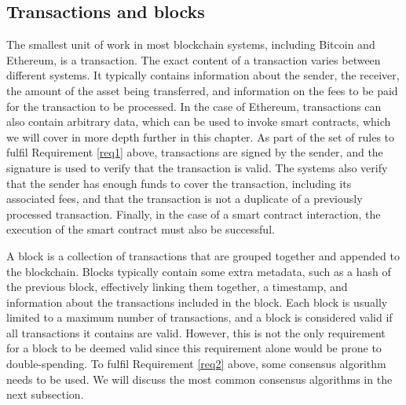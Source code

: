 
\subsection{Transactions and blocks}
 The smallest unit of work in most blockchain systems, including Bitcoin and Ethereum, is a transaction.
The exact content of a transaction varies between different systems. It typically contains information about the sender, the receiver, the amount of the asset being transferred, and information on the fees to be paid for the transaction to be processed.
In the case of Ethereum, transactions can also contain arbitrary data, which can be used to invoke smart contracts, which we will cover in more depth further in this chapter.
As part of the set of rules to fulfil Requirement \ref{req1} above, transactions are signed by the sender, and the signature is used to verify that the transaction is valid.
The systems also verify that the sender has enough funds to cover the transaction, including its associated fees, and that the transaction is not a duplicate of a previously processed transaction.
Finally, in the case of a smart contract interaction, the execution of the smart contract must also be successful.

A block is a collection of transactions that are grouped together and appended to the blockchain.
Blocks typically contain some extra metadata, such as a hash of the previous block, effectively linking them together, a timestamp, and information about the transactions included in the block.
Each block is usually limited to a maximum number of transactions, and a block is considered valid if all transactions it contains are valid.
However, this is not the only requirement for a block to be deemed valid since this requirement alone would be prone to double-spending.
To fulfil Requirement \ref{req2} above, some consensus algorithm needs to be used.
We will discuss the most common consensus algorithms in the next subsection.

